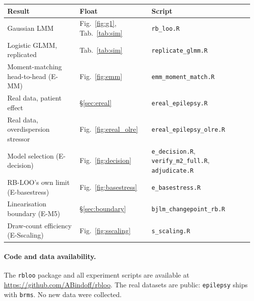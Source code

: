 \documentclass[11pt]{article}
\begin{document}
\begin{center}\small
\begin{tabular}{lll}
\toprule
Result & Float & Script\\
\midrule
Gaussian LMM & Fig.~\ref{fig:g1}, Tab.~\ref{tab:sim} & \texttt{rb\_loo.R}\\
Logistic GLMM, replicated & Tab.~\ref{tab:sim} & \texttt{replicate\_glmm.R}\\
Moment-matching head-to-head (E-MM) & Fig.~\ref{fig:emm} & \texttt{emm\_moment\_match.R}\\
Real data, patient effect & \S\ref{sec:ereal} & \texttt{ereal\_epilepsy.R}\\
Real data, overdispersion stressor & Fig.~\ref{fig:ereal_olre} & \texttt{ereal\_epilepsy\_olre.R}\\
Model selection (E-decision) & Fig.~\ref{fig:decision} & \texttt{e\_decision.R}, \texttt{verify\_m2\_full.R}, \texttt{adjudicate.R}\\
RB-LOO's own limit (E-basestress) & Fig.~\ref{fig:basestress} & \texttt{e\_basestress.R}\\
Linearisation boundary (E-M5) & \S\ref{sec:boundary} & \texttt{bjlm\_changepoint\_rb.R}\\
Draw-count efficiency (E-Sscaling) & Fig.~\ref{fig:sscaling} & \texttt{s\_scaling.R}\\
\bottomrule
\end{tabular}
\end{center}

\paragraph{Code and data availability.} The \texttt{rbloo} package and all
experiment scripts are available at
\url{https://github.com/ABindoff/rbloo}. The real datasets are public:
\texttt{epilepsy} ships with \texttt{brms}. No new data were collected.
\end{document}
